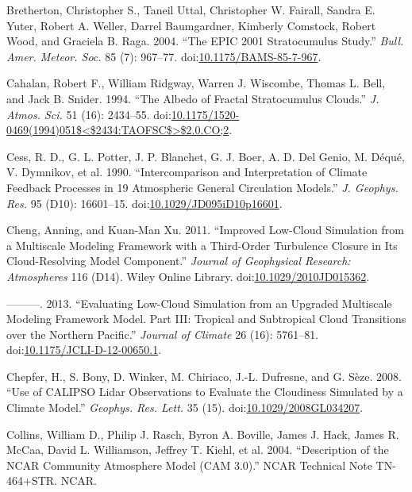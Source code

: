 \hypertarget{ref-brethertonux5fetux5falux5f2004}{}
Bretherton, Christopher S., Taneil Uttal, Christopher W. Fairall, Sandra
E. Yuter, Robert A. Weller, Darrel Baumgardner, Kimberly Comstock,
Robert Wood, and Graciela B. Raga. 2004. ``The EPIC 2001 Stratocumulus
Study.'' \emph{Bull. Amer. Meteor. Soc.} 85 (7): 967--77.
doi:\href{https://doi.org/10.1175/BAMS-85-7-967}{10.1175/BAMS-85-7-967}.

\hypertarget{ref-cahalanux5fetux5falux5f1994}{}
Cahalan, Robert F., William Ridgway, Warren J. Wiscombe, Thomas L. Bell,
and Jack B. Snider. 1994. ``The Albedo of Fractal Stratocumulus
Clouds.'' \emph{J. Atmos. Sci.} 51 (16): 2434--55.
doi:\href{https://doi.org/10.1175/1520-0469(1994)051$\%3C$2434:TAOFSC$\%3E$2.0.CO;2}{10.1175/1520-0469(1994)051\$\textless{}\$2434:TAOFSC\$\textgreater{}\$2.0.CO;2}.

\hypertarget{ref-cessux5fetux5falux5f1990}{}
Cess, R. D., G. L. Potter, J. P. Blanchet, G. J. Boer, A. D. Del Genio,
M. Déqué, V. Dymnikov, et al. 1990. ``Intercomparison and Interpretation
of Climate Feedback Processes in 19 Atmospheric General Circulation
Models.'' \emph{J. Geophys. Res.} 95 (D10): 16601--15.
doi:\href{https://doi.org/10.1029/JD095iD10p16601}{10.1029/JD095iD10p16601}.

\hypertarget{ref-chengux5fandux5fxuux5f2011}{}
Cheng, Anning, and Kuan-Man Xu. 2011. ``Improved Low-Cloud Simulation
from a Multiscale Modeling Framework with a Third-Order Turbulence
Closure in Its Cloud-Resolving Model Component.'' \emph{Journal of
Geophysical Research: Atmospheres} 116 (D14). Wiley Online Library.
doi:\href{https://doi.org/10.1029/2010JD015362}{10.1029/2010JD015362}.

\hypertarget{ref-chengux5fandux5fxuux5f2013}{}
---------. 2013. ``Evaluating Low-Cloud Simulation from an Upgraded
Multiscale Modeling Framework Model. Part III: Tropical and Subtropical
Cloud Transitions over the Northern Pacific.'' \emph{Journal of Climate}
26 (16): 5761--81.
doi:\href{https://doi.org/10.1175/JCLI-D-12-00650.1}{10.1175/JCLI-D-12-00650.1}.

\hypertarget{ref-chepferux5fetux5falux5f2008}{}
Chepfer, H., S. Bony, D. Winker, M. Chiriaco, J.-L. Dufresne, and G.
Sèze. 2008. ``Use of CALIPSO Lidar Observations to Evaluate the
Cloudiness Simulated by a Climate Model.'' \emph{Geophys. Res. Lett.} 35
(15).
doi:\href{https://doi.org/10.1029/2008GL034207}{10.1029/2008GL034207}.

\hypertarget{ref-collinsux5fetux5falux5f2004}{}
Collins, William D., Philip J. Rasch, Byron A. Boville, James J. Hack,
James R. McCaa, David L. Williamson, Jeffrey T. Kiehl, et al. 2004.
``Description of the NCAR Community Atmosphere Model (CAM 3.0).'' NCAR
Technical Note TN-464+STR. NCAR.


